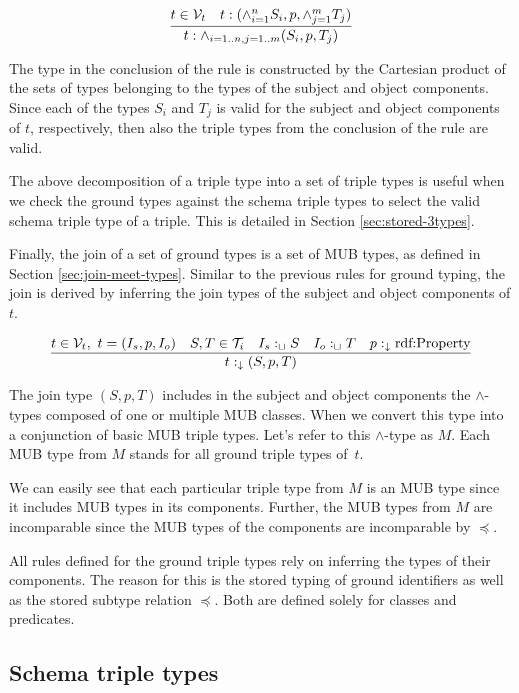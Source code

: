 \documentclass[runningheads]{llncs}
\newcommand{\darr}{\downarrow}
\newcommand{\V}{{\cal V}}
\newcommand{\T}{{\cal T}}
\begin{document}
\begin{equation}
\label{rul:3-land-transform}
\dfrac{t\in\V_t\quad t:(\land_{i=1}^n\/S_i,p,\land_{j=1}^m\/T_j)}
      {t:\land_{i=1..n, j=1..m}(S_i,p,T_j)}
\end{equation}

The type in the conclusion of the rule is constructed by the Cartesian
product of the sets of types belonging to the types of the subject and
object components. Since each of the types $S_i$ and $T_j$ is valid
for the subject and object components of $t$, respectively, then also the triple types from the conclusion of the rule are valid.

The above decomposition of a triple type into a set of triple types is
useful when we check the ground types against the schema triple types
to select the valid schema triple type of a triple. This is detailed in
Section \ref{sec:stored-3types}.

Finally, the join of a set of ground types is a set of MUB types, as
defined in Section \ref{sec:join-meet-types}. Similar to the
previous rules for ground typing, the join is derived by inferring the
join types of the subject and object components of $t$.

\begin{equation}
\label{rul:3-join}
\dfrac{t\in\V_t,\ t=(I_s,p,I_o)\quad S,T\in\T_i\quad I_s:_\sqcup\/S\quad I_o:_\sqcup\/T\quad p:_\darr\text{rdf:Property}}
      {t:_\darr\/(S,p,T)}
\end{equation}

The join type $(S,p,T)$ includes in the subject and object components
the $\land$-types composed of one or multiple MUB classes. When we
convert this type into a conjunction of basic MUB triple types. Let's
refer to this $\land$-type as $M$. Each MUB type from $M$ stands for
all ground triple types of~$t$.

We can easily see that each particular triple type from $M$ is an MUB
type since it includes MUB types in its components. Further, the MUB
types from $M$ are incomparable since the MUB types of the components
are incomparable by $\preceq$.

All rules defined for the ground triple types rely on inferring the
types of their components. The reason for this is the stored typing
of ground identifiers as well as the stored subtype relation $\preceq$.
Both are defined solely for classes and predicates.





\subsection{Schema triple types\label{sec:stored-3types}}
\end{document}
